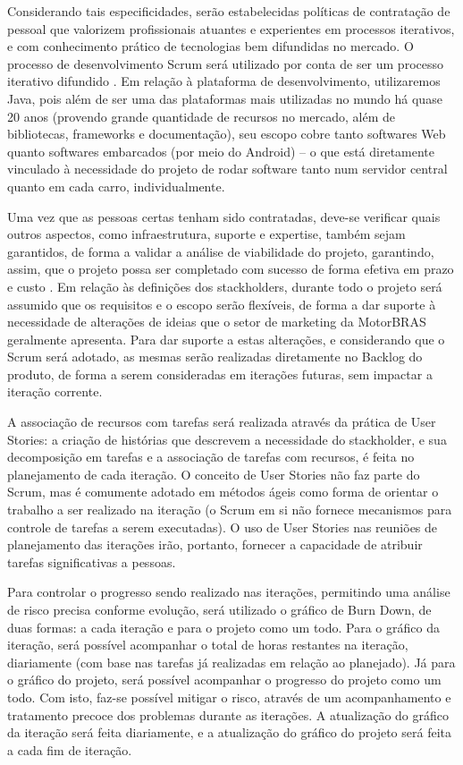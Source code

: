 \documentclass[12pt,journal,compsoc]{IEEEtran}
\begin{document}
Considerando tais especificidades, serão estabelecidas políticas de contratação de pessoal que valorizem profissionais atuantes e experientes em processos iterativos, e com conhecimento prático de tecnologias bem difundidas no mercado. O processo de desenvolvimento Scrum será utilizado por conta de ser um processo iterativo difundido \cite{scrum_development_process}. Em relação à plataforma de desenvolvimento, utilizaremos Java, pois além de ser uma das plataformas mais utilizadas no mundo há quase 20 anos \cite{tiobe_language} (provendo grande quantidade de recursos no mercado, além de bibliotecas, frameworks e documentação), seu escopo cobre tanto softwares Web quanto softwares embarcados (por meio do Android) -- o que está diretamente vinculado à necessidade do projeto de rodar software tanto num servidor central quanto em cada carro, individualmente.

Uma vez que as pessoas certas tenham sido contratadas, deve-se verificar quais outros aspectos, como infraestrutura, suporte e expertise, também sejam  garantidos, de forma a validar a análise de viabilidade do projeto, garantindo, assim, que o projeto possa ser completado com sucesso de forma efetiva em prazo e custo \cite{society_software_2004}. Em relação às definições dos stackholders, durante todo o projeto será assumido que os requisitos e o escopo serão flexíveis, de forma a dar suporte à necessidade de alterações de ideias que o setor de marketing da MotorBRAS geralmente apresenta. Para dar suporte a estas alterações, e considerando que o Scrum será adotado, as mesmas serão realizadas diretamente no Backlog do produto, de forma a serem consideradas em iterações futuras, sem impactar a iteração corrente. \cite{schwaber_scrum_2013}

A associação de recursos com tarefas será realizada através da prática de User Stories: a criação de histórias que descrevem a necessidade do stackholder, e sua decomposição em tarefas e a associação de tarefas com recursos, é feita no planejamento de cada iteração. O conceito de User Stories não faz parte do Scrum, mas é comumente adotado em métodos ágeis como forma de orientar o trabalho a ser realizado na iteração \cite{user_stories_applied} (o Scrum em si não fornece mecanismos para controle de tarefas a serem executadas). O uso de User Stories nas reuniões de planejamento das iterações irão, portanto, fornecer a capacidade de atribuir tarefas significativas a pessoas.

Para controlar o progresso sendo realizado nas iterações, permitindo uma análise de risco precisa conforme evolução, será utilizado o gráfico de Burn Down, de duas formas: a cada iteração e para o projeto como um todo. Para o gráfico da iteração, será possível acompanhar o total de horas restantes na iteração, diariamente (com base nas tarefas já realizadas em relação ao planejado). Já para o gráfico do projeto, será possível acompanhar o progresso do projeto como um todo. \cite{understanding_agile_scrum} Com isto, faz-se possível mitigar o risco, através de um acompanhamento e tratamento precoce dos problemas durante as iterações. A atualização do gráfico da iteração será feita diariamente, e a atualização do gráfico do projeto será feita a cada fim de iteração.
\end{document}
